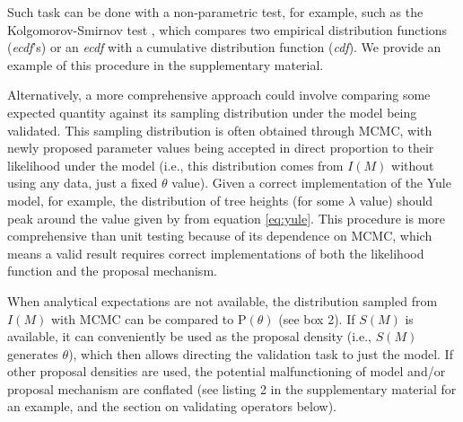 \documentclass[oneside]{article}
\begin{document}
\begin{tcolorbox}[breakable, width=\textwidth, colback=gray!10, boxrule=0pt,
  title=Box 2: Additional validation sanity-checks, fonttitle=\bfseries]
  \vspace{.15cm}
  Such task can be done with a non-parametric test, for example, such
  as the Kolgomorov-Smirnov test \citep{kolgomorov,smirnov,ks}, which
  compares two empirical distribution functions (\emph{ecdf}'s) or an
  \emph{ecdf} with a cumulative distribution function (\emph{cdf}).
  We provide an example of this procedure in the supplementary material.
\end{tcolorbox}

Alternatively, a more comprehensive approach could involve comparing
some expected quantity against its sampling distribution under the
model being validated.
This sampling distribution is often obtained through MCMC, with
newly proposed parameter values being accepted in direct proportion to
their likelihood under the model (i.e., this distribution comes from
$I(M)$ without using any data, just a fixed $\theta$ value).
Given a correct implementation of the Yule model,
for example, the distribution of tree heights (for some $\lambda$
value) should peak around the value given by from equation \ref{eq:yule}.
This procedure is more comprehensive than unit testing because of its
dependence on MCMC, which means a valid result requires correct
implementations of both the likelihood function and the proposal mechanism.

When analytical expectations are not available, the distribution
sampled from $I(M)$ with MCMC can be compared to $\text{P}(\theta)$
(see box 2).
If $S(M)$ is available, it can conveniently be used as the proposal
density (i.e., $S(M)$ generates $\theta$),
which then allows directing the validation task to just the model.
If other proposal densities are used, the potential malfunctioning of
model and/or proposal mechanism are conflated (see listing 2 in the
supplementary material for an example, and the section on validating
operators below).



\end{document}
